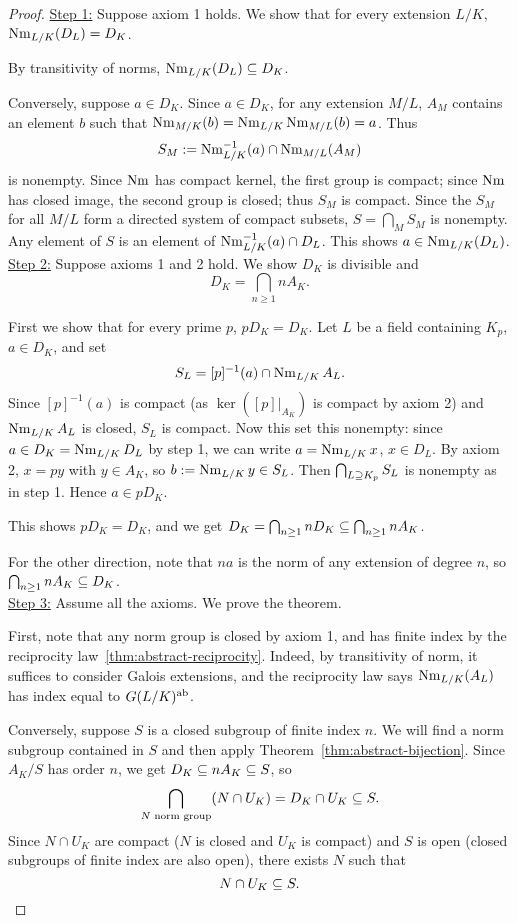 \begin{proof}
\noindent \underline{Step 1:} Suppose axiom 1 holds. We show that for every extension $L/K$, $\operatorname{Nm}_{L/K}(D_L)=D_K$.

By transitivity of norms, $\operatorname{Nm}_{L/K}(D_L)\subseteq D_K$.

Conversely, suppose $a\in D_K$. Since $a\in D_K$, for any extension $M/L$, $A_M$ contains an element $b$ such that $\operatorname{Nm}_{M/K}(b)=\operatorname{Nm}_{L/K}\operatorname{Nm}_{M/L} (b)=a$. Thus \[S_M:=\operatorname{Nm}_{L/K}^{-1}(a)\cap \operatorname{Nm}_{M/L}(A_M)\]
is nonempty. Since $\operatorname{Nm}$ has compact kernel, the first group is compact; since $\operatorname{Nm}$ has closed image, the second group is closed; thus $S_M$ is compact. Since the $S_M$ for all $M/L$ form a directed system of compact subsets, $S=\bigcap_M S_M$ is nonempty. Any element of $S$ is an element of $\operatorname{Nm}_{L/K}^{-1}(a)\cap D_L$. This shows $a\in \operatorname{Nm}_{L/K}(D_L)$.\\

\noindent\underline{Step 2:} Suppose axioms 1 and 2 hold. We show $D_K$ is divisible and
\[
D_K=\bigcap_{n\ge 1} nA_K.
\]

First we show that for every prime $p$, $pD_K=D_K$. Let $L$ be a field containing $K_p$, $a\in D_K$, and set
\[
S_L=[p]^{-1}(a)\cap \operatorname{Nm}_{L/K} A_L.
\]
Since $[p]^{-1}(a)$ is compact (as $\ker([p]|_{A_K})$ is compact by axiom 2) and $\operatorname{Nm}_{L/K}A_L$ is closed, $S_L$ is compact. Now this set this nonempty: since $a\in D_K=\operatorname{Nm}_{L/K}D_L$ by step 1, we can write $a=\operatorname{Nm}_{L/K} x$, $x\in D_L$. By axiom 2, $x=py$ with $y\in A_K$, so $b:=\operatorname{Nm}_{L/K}y\in S_L$. Then $\bigcap_{L\supseteq K_p}S_L$ is nonempty as in step 1. Hence $a\in pD_K$.

This shows $pD_K=D_K$, and we get $D_K=\bigcap_{n\ge 1}nD_K\subseteq \bigcap_{n\ge1}nA_K$. 

For the other direction, note that $na$ is the norm of any extension of degree $n$, so $\bigcap_{n\ge 1} nA_K\subseteq D_K$.\\

\noindent\underline{Step 3:} Assume all the axioms. We prove the theorem. 

First, note that any norm group is closed by axiom 1, and has finite index by the reciprocity law~\ref{thm:abstract-reciprocity}. Indeed, by transitivity of norm, it suffices to consider Galois extensions, and the reciprocity law says $\operatorname{Nm}_{L/K}(A_L)$ has index equal to $G(L/K)^{\text{ab}}$.

Conversely, suppose $S$ is a closed subgroup of finite index $n$. We will find a norm subgroup contained in $S$ and then apply Theorem~\ref{thm:abstract-bijection}. Since $A_K/S$ has order $n$, we get $D_K\subseteq nA_K\subseteq S$, so 
\[
\bigcap_{N\text{ norm group}} (N\cap U_K)=D_K\cap U_K\subseteq S.
\]
Since $N\cap U_K$ are compact ($N$ is closed and $U_K$ is compact) and $S$ is open (closed subgroups of finite index are also open), there exists $N$ such that 
\[
N\cap U_K\subseteq S.
\]


\end{proof}

